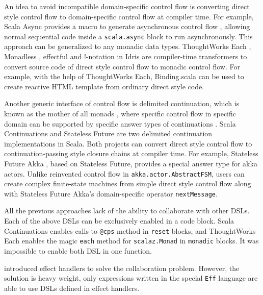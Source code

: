 An idea to avoid incompatible domain-specific control flow is converting direct style control flow to domain-specific control flow at compiler time. For example, Scala Async provides a macro to generate asynchronous control flow \cite{haller2013sip}, allowing normal sequential code inside a \lstinline{scala.async} block to run asynchronously. This approach can be generalized to any monadic data types. ThoughtWorks Each \cite{yangbo2015each}, Monadless \cite{flavio2017monadless}, effectful \cite{crockett2013effectful} and !-notation in Idris \cite{brady2013idris} are compiler-time transformers to convert source code of direct style control flow to monadic control flow. For example, with the help of ThoughtWorks Each, Binding.scala\cite{yangbo2016binding} can be used to create reactive HTML template from ordinary direct style code.

Another generic interface of control flow is delimited continuation, which is known as the mother of all monads \cite{piponi2008mother}, where specific control flow in specific domain can be supported by specific answer types of continuations \cite{asai2007polymorphic}. Scala Continuations \cite{rompf2009implementing} and Stateless Future \cite{yangbo2014stateless} are two delimited continuation implementations in Scala. Both projects can convert direct style control flow to continuation-passing style closure chains at compiler time. For example, Stateless Future Akka \cite{yangbo2014statelessfutureakka}, based on Stateless Future, provides a special answer type for akka actors. Unlike reinvented control flow in \lstinline{akka.actor.AbstractFSM}, users can create complex finite-state machines from simple direct style control flow along with Stateless Future Akka's domain-specific operator \lstinline{nextMessage}.

All the previous approaches lack of the ability to collaborate with other DSLs. Each of the above DSLs can be exclusively enabled in a code block. Scala Continuations enables calls to \lstinline{@cps} method in \lstinline{reset} blocks, and ThoughtWorks Each enables the magic \lstinline{each} method \cite{yangbo2015each} for \lstinline{scalaz.Monad} in \lstinline{monadic} blocks. It was impossible to enable both DSL in one function.

\cite{kiselyov2013extensible} introduced effect handlers to solve the collaboration problem. However, the solution is heavy weight, only expressions written in the special \lstinline{Eff} language are able to use DSLs defined in effect handlers.

